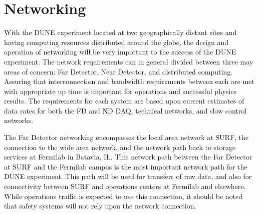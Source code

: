 \documentclass[../main-v1.tex]{subfiles}
\begin{document}
\chapter{Networking }
\label{ch:netw}




With the DUNE experiment located at two geographically distant sites and having computing resources distributed around the globe, the design and operation of networking will be very important to the success of the DUNE experiment. The network requirements can in general divided between three may areas of concern: Far Detector, Near Detector, and distributed computing. Assuring that interconnection and bandwidth requirements between each are met with appropriate up time is important for operations and successful physics results. The requirements for each system are based upon current estimates of data rates for both the FD and ND DAQ, technical networks, and slow control networks.

The Far Detector networking encompasses the local area network at SURF, the connection to the wide area network, and the network path back to storage services at Fermilab in Batavia, IL. This network path between the Far Detector at SURF and the Fermilab campus is the most important network path for the DUNE experiment. This path will be used for  transfers of raw data, and also for connectivity between SURF and operations centers at Fermilab and elsewhere. While operations traffic is expected to use this connection, it should be noted that safety systems will not rely upon the network connection.
\end{document}
